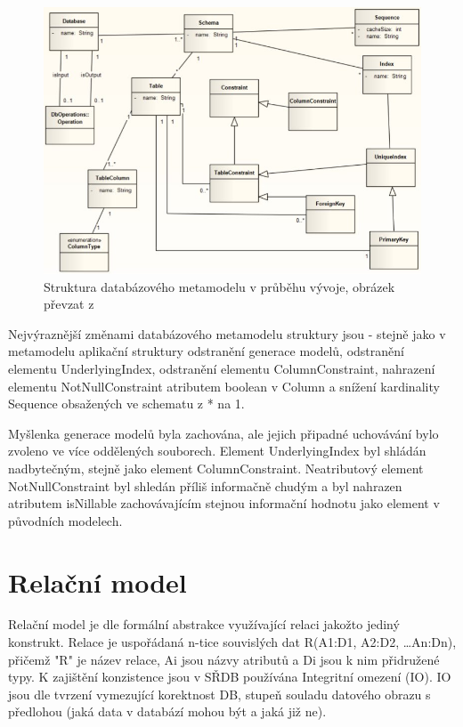 \documentclass[11pt,twoside,a4paper]{book}
\begin{document}
%
\begin{figure}[H]
\begin{center}
\includegraphics[width=15cm]{figures/rdb_structure_lukes}
\caption{Struktura databázového metamodelu v průběhu vývoje, obrázek převzat z
\cite{Lukes}}
\label{fig:rdb_str_lukes}
\end{center}
\end{figure}
%
\FloatBarrier

 Nejvýraznější změnami databázového metamodelu struktury jsou - stejně jako v
 metamodelu aplikační struktury odstranění generace modelů, odstranění elementu
 UnderlyingIndex, odstranění elementu ColumnConstraint, nahrazení elementu
 NotNullConstraint atributem boolean v Column a snížení kardinality Sequence
 obsažených ve schematu z * na 1.
 
 Myšlenka generace modelů byla zachována, ale jejich připadné uchovávání bylo
 zvoleno ve více oddělených souborech. Element UnderlyingIndex byl shládán
 nadbytečným, stejně jako element ColumnConstraint. Neatributový element
 NotNullConstraint byl shledán příliš informačně chudým a byl nahrazen atributem
 isNillable zachovávajícím stejnou informační hodnotu jako element v původních
 modelech. 


\section{Relační model}
Relační model je dle \cite{DBS_02} formální abstrakce
využívající relaci jakožto jediný konstrukt. Relace je uspořádaná n-tice
souvislých dat R(A1:D1, A2:D2, \ldots An:Dn), přičemž "R" je název relace, Ai
jsou názvy atributů a Di jsou k nim přidružené typy. K zajištění konzistence
jsou v SŘDB používána Integritní omezení (IO). IO jsou dle \cite{DBS2_02} tvrzení
vymezující korektnost DB, stupeň souladu datového obrazu s předlohou (jaká data
v databází mohou být a jaká již ne).
\end{document}
